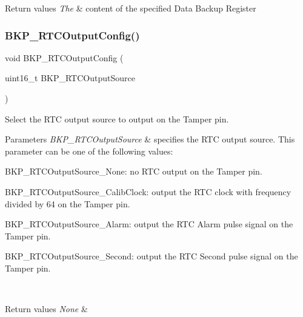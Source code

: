 \begin{DoxyRetVals}{Return values}
{\em The} & content of the specified Data Backup Register \\
\hline
\end{DoxyRetVals}
\mbox{\label{group___b_k_p___exported___functions_ga3d1b22b3c6a79f7b423616a0af1885bf}} 
\subsubsection{\texorpdfstring{BKP\_RTCOutputConfig()}{BKP\_RTCOutputConfig()}}
{\footnotesize\ttfamily void B\+K\+P\+\_\+\+R\+T\+C\+Output\+Config (\begin{DoxyParamCaption}\item[{uint16\+\_\+t}]{B\+K\+P\+\_\+\+R\+T\+C\+Output\+Source }\end{DoxyParamCaption})}



Select the R\+TC output source to output on the Tamper pin. 


\begin{DoxyParams}{Parameters}
{\em B\+K\+P\+\_\+\+R\+T\+C\+Output\+Source} & specifies the R\+TC output source. This parameter can be one of the following values\+: \begin{DoxyItemize}
\item B\+K\+P\+\_\+\+R\+T\+C\+Output\+Source\+\_\+\+None\+: no R\+TC output on the Tamper pin. \item B\+K\+P\+\_\+\+R\+T\+C\+Output\+Source\+\_\+\+Calib\+Clock\+: output the R\+TC clock with frequency divided by 64 on the Tamper pin. \item B\+K\+P\+\_\+\+R\+T\+C\+Output\+Source\+\_\+\+Alarm\+: output the R\+TC Alarm pulse signal on the Tamper pin. \item B\+K\+P\+\_\+\+R\+T\+C\+Output\+Source\+\_\+\+Second\+: output the R\+TC Second pulse signal on the Tamper pin.\end{DoxyItemize}
\\
\hline
\end{DoxyParams}

\begin{DoxyRetVals}{Return values}
{\em None} & \\
\hline
\end{DoxyRetVals}
\mbox{\label{group___b_k_p___exported___functions_gad34db08a944450d2e7d56d0fd8db2bca}} 
